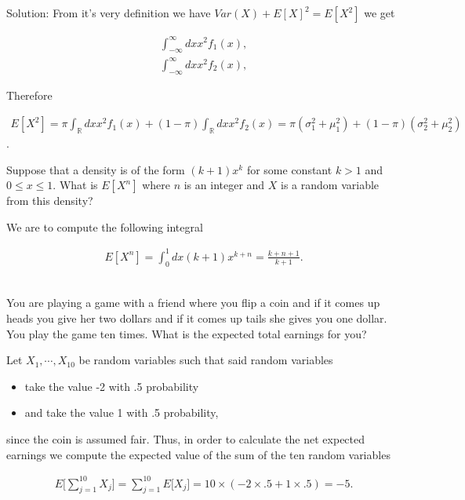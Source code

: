 \documentclass{homework}
\begin{document}
Solution: From it's very definition we have $Var(X)+E[X]^2=E[X^2]$ we get 

\begin{align*}
\int_{-\infty}^{\infty} dx x^2 f_{1}(x), \\
\int_{-\infty}^{\infty} dx x^2 f_{2}(x),
\end{align*}

Therefore 

\begin{align*}
    E[X^2]= \pi \int_{\mathds{R}} dx x^2f_{1}(x)+(1-\pi) \int_{\mathds{R}} dx x^2f_{2}(x) = \pi(\sigma_1^2+\mu_1^2) + (1-\pi)(\sigma_2^2+\mu_2^2)
\end{align*}. \\

\begin{tcolorbox}[title=Question 12]
Suppose that a density is of the form $(k+1)x^k$
for some constant $k > 1$ and $0 \leq x \leq 1$. What is $E[X^n]$ where $n$ is an integer and $X$ is a random variable from this density?
\end{tcolorbox}

We are to compute the following integral

\begin{align*}
    E[X^n]=\int_{0}^{1} dx (k+1)x^{k+n}= \frac{k+n+1}{k+1}.
\end{align*} \\


\begin{tcolorbox}[title=Question 13]
You are playing a game with a friend where you flip a coin and if it comes up heads you give her two dollars and if it comes up tails she gives you one dollar. You play the game ten times. What is the expected total earnings for you?
\end{tcolorbox}

Let $X_1,\cdots,X_{10}$ be random variables such that said random variables

\begin{itemize}
    \item take the value -2 with .5 probability
    \item and take the value 1 with .5 probability,
\end{itemize}

since the coin is assumed fair. Thus, in order to calculate the net expected earnings we compute the expected value of the sum of the ten random variables

\begin{align*}
    E\bigg[\sum_{j=1}^{10}X_j\bigg] =  \sum_{j=1}^{10} E\bigg[X_j\bigg] = 10 \times (-2 \times .5 + 1 \times .5) = -5.
\end{align*}
\end{document}
